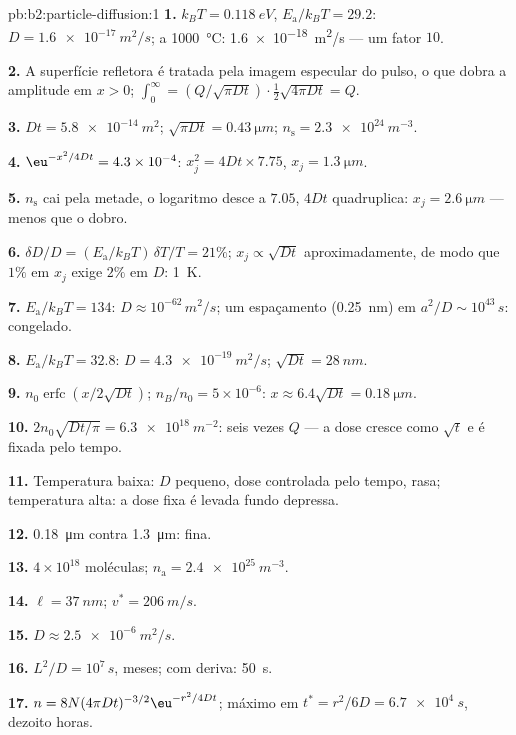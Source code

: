 \begin{solution}{pb:b2:particle-diffusion:1}
\textbf{1.} $k_BT = \qty{0.118}{eV}$, $E_{\text{a}}/k_BT = 29.2$: $D =
\qty{1.6e-17}{m^2/s}$; a \qty{1000}{\celsius}: \qty{1.6e-18}{m^2/s} --- um
fator $10$.

\textbf{2.} A superfície refletora é tratada pela imagem especular do
pulso, o que dobra a amplitude em $x > 0$; $\int_0^\infty = (Q/\sqrt{\pi Dt})
\cdot \tfrac12\sqrt{4\pi Dt} = Q$.

\textbf{3.} $Dt = \qty{5.8e-14}{m^2}$; $\sqrt{\pi Dt} = \qty{0.43}{\micro m}$; $n_{\text{s}}
= \qty{2.3e24}{m^{-3}}$.

\textbf{4.} $\eu^{-x^2/4Dt} = 4.3 \times 10^{-4}$: $x_j^2 = 4Dt \times 7.75$, $x_j =
\qty{1.3}{\micro m}$.

\textbf{5.} $n_{\text{s}}$ cai pela metade, o logaritmo desce a $7.05$, $4Dt$
quadruplica: $x_j = \qty{2.6}{\micro m}$ --- menos que o dobro.

\textbf{6.} $\delta D/D = (E_{\text{a}}/k_BT)\,\delta T/T = 21\%$; $x_j \propto
\sqrt{Dt}$ aproximadamente, de modo que $1\%$ em $x_j$ exige $2\%$ em $D$: \qty{1}{K}.

\textbf{7.} $E_{\text{a}}/k_BT = 134$: $D \approx 10^{-62}\,\unit{m^2/s}$; um
espaçamento (\qty{0.25}{nm}) em $a^2/D \sim 10^{43}\,\unit{s}$: congelado.

\textbf{8.} $E_{\text{a}}/k_BT = 32.8$: $D = \qty{4.3e-19}{m^2/s}$; $\sqrt{Dt} =
\qty{28}{nm}$.

\textbf{9.} $n_0\operatorname{erfc}(x/2\sqrt{Dt})$; $n_B/n_0 = 5 \times 10^{-6}$:
$x \approx 6.4\sqrt{Dt} = \qty{0.18}{\micro m}$.

\textbf{10.} $2n_0\sqrt{Dt/\pi} = \qty{6.3e18}{m^{-2}}$: seis vezes $Q$ ---
a dose cresce como $\sqrt t$ e é fixada pelo tempo.

\textbf{11.} Temperatura baixa: $D$ pequeno, dose controlada pelo tempo,
rasa; temperatura alta: a dose fixa é levada fundo depressa.

\textbf{12.} \qty{0.18}{\micro m} contra \qty{1.3}{\micro m}: fina.

\textbf{13.} $4 \times 10^{18}$ moléculas; $n_{\text{a}} = \qty{2.4e25}{m^{-3}}$.

\textbf{14.} $\ell = \qty{37}{nm}$; $v^* = \qty{206}{m/s}$.

\textbf{15.} $D \approx \qty{2.5e-6}{m^2/s}$.

\textbf{16.} $L^2/D = 10^7\,\unit{s}$, meses; com deriva: \qty{50}{s}.

\textbf{17.} $n = 8N(4\pi Dt)^{-3/2}\eu^{-r^2/4Dt}$; máximo em $t^* = r^2/6D =
\qty{6.7e4}{s}$, dezoito horas.


\end{solution}

